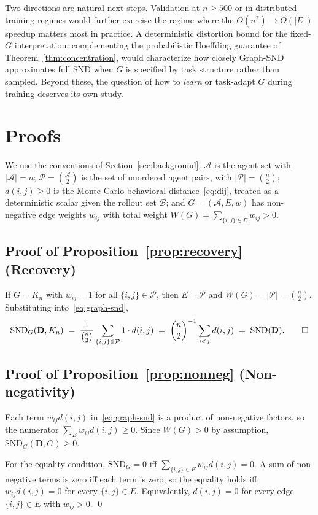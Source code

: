 \documentclass[11pt]{article}
\theoremstyle{plain}
\theoremstyle{definition}
\theoremstyle{remark}
\newcommand{\Agents}{\mathcal{A}}        %
\newcommand{\Rollouts}{\mathcal{B}}      %
\newcommand{\Pairs}{\mathcal{P}}         %
\newcommand{\SND}{\ensuremath{\mathrm{SND}}}
\newcommand{\SNDG}{\mathrm{SND}_{G}}
\begin{document}
Two directions are natural next steps. Validation at $n \geq 500$ or in distributed training regimes would further exercise the regime where the $O(n^2) \to O(|E|)$ speedup matters most in practice. A deterministic distortion bound for the
fixed-$G$ interpretation, complementing the probabilistic
Hoeffding guarantee of Theorem~\ref{thm:concentration}, would
characterize how closely Graph-SND approximates full SND when $G$ is
specified by task structure rather than sampled. Beyond these, the
question of how to \emph{learn} or task-adapt $G$ during training
deserves its own study.
\appendix
\section{Proofs}
\label{app:proofs}

We use the conventions of Section~\ref{sec:background}: $\Agents$ is the
agent set with $|\Agents| = n$; $\Pairs = \binom{\Agents}{2}$ is the set
of unordered agent pairs, with $|\Pairs| = \binom{n}{2}$; $d(i,j) \geq 0$
is the Monte Carlo behavioral distance~\eqref{eq:dij}, treated as a
deterministic scalar given the rollout set $\Rollouts$; and $G = (\Agents,
E, w)$ has non-negative edge weights $w_{ij}$ with total weight
$W(G) = \sum_{\{i,j\} \in E} w_{ij} > 0$.

\subsection*{Proof of Proposition~\ref{prop:recovery} (Recovery)}

If $G = K_n$ with $w_{ij} = 1$ for all $\{i,j\} \in \Pairs$, then
$E = \Pairs$ and $W(G) = |\Pairs| = \binom{n}{2}$. Substituting
into~\eqref{eq:graph-snd},
\[
\SNDG(\mathbf{D}, K_n)
\;=\; \frac{1}{\binom{n}{2}} \sum_{\{i,j\} \in \Pairs} 1 \cdot d(i,j)
\;=\; \binom{n}{2}^{-1} \sum_{i < j} d(i,j)
\;=\; \SND(\mathbf{D}). \qed
\]

\subsection*{Proof of Proposition~\ref{prop:nonneg} (Non-negativity)}

Each term $w_{ij} d(i,j)$ in~\eqref{eq:graph-snd} is a product of
non-negative factors, so the numerator $\sum_{E} w_{ij} d(i,j) \geq 0$.
Since $W(G) > 0$ by assumption, $\SNDG(\mathbf{D}, G) \geq 0$.

For the equality condition, $\SNDG = 0$ iff
$\sum_{\{i,j\} \in E} w_{ij} d(i,j) = 0$. A sum of non-negative terms is
zero iff each term is zero, so the equality holds iff $w_{ij} d(i,j) = 0$
for every $\{i,j\} \in E$. Equivalently, $d(i,j) = 0$ for every edge
$\{i,j\} \in E$ with $w_{ij} > 0$. \qed
\end{document}
